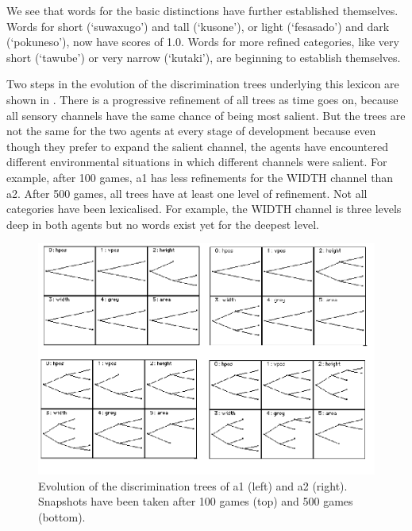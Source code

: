 We see that words for the basic distinctions have further established
themselves. Words for short (`suwaxugo') and tall (`kusone'), or light (`fesasado') and dark 
(`pokuneso'), now have scores of 1.0. Words for more refined categories, like very short (`tawube') or 
very narrow (`kutaki'), are beginning to establish themselves.  

Two steps in the evolution of the discrimination trees
underlying this lexicon are shown in .
There is a progressive refinement 
of all trees as time goes on, 
because all sensory channels have the same chance
of being most salient. But the trees are not 
the same for the two agents at every stage
of development because even though they prefer to expand
the salient channel, the agents have encountered 
different environmental situations in which different
channels were salient. For example, after 100 
games, {\bfshape  a1} has less refinements for the 
WIDTH channel than {\bfshape  a2}. 
After 500 games, all trees 
have at least one level of refinement. Not all 
categories have been lexicalised. For example, the 
WIDTH channel is three levels deep in both 
agents but no words exist yet for the deepest 
level. 


\begin{figure}[htbp]
  \centerline{\includegraphics[width=\textwidth]{chap6/figs/gdis.pdf}}
\caption{\label{gdis1}Evolution of the discrimination
trees of {\bfshape  a1} (left) and {\bfshape  a2} (right).
Snapshots have been taken after 100 games (top) and 500 
games (bottom).} 
\end{figure}

